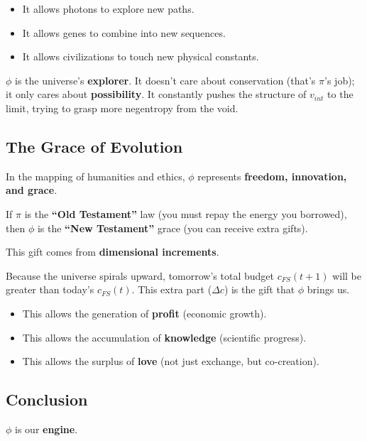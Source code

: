 \begin{itemize}
\item It allows photons to explore new paths.

\item It allows genes to combine into new sequences.

\item It allows civilizations to touch new physical constants.
\end{itemize}

$\phi$ is the universe's \textbf{explorer}. It doesn't care about conservation (that's $\pi$'s job); it only cares about \textbf{possibility}. It constantly pushes the structure of $v_{int}$ to the limit, trying to grasp more negentropy from the void.

\subsection{The Grace of Evolution}

In the mapping of humanities and ethics, $\phi$ represents \textbf{freedom, innovation, and grace}.

If $\pi$ is the \textbf{``Old Testament''} law (you must repay the energy you borrowed), then $\phi$ is the \textbf{``New Testament''} grace (you can receive extra gifts).

This gift comes from \textbf{dimensional increments}.

Because the universe spirals upward, tomorrow's total budget $c_{FS}(t+1)$ will be greater than today's $c_{FS}(t)$. This extra part ($\Delta c$) is the gift that $\phi$ brings us.

\begin{itemize}
\item This allows the generation of \textbf{profit} (economic growth).

\item This allows the accumulation of \textbf{knowledge} (scientific progress).

\item This allows the surplus of \textbf{love} (not just exchange, but co-creation).
\end{itemize}

\subsection{Conclusion}

$\phi$ is our \textbf{engine}.

